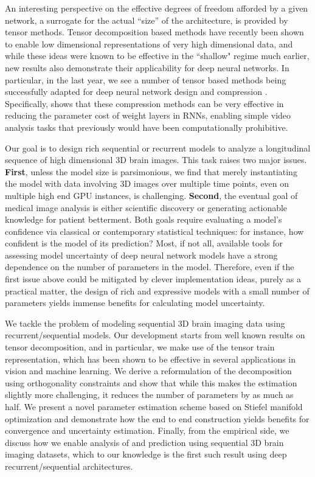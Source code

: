 An interesting perspective on the effective degrees of freedom afforded 
by a given network, a surrogate for the actual ``size'' of the architecture, 
is provided by tensor methods.
Tensor decomposition based methods have recently been shown to enable low dimensional representations of very high dimensional data, 
and while these ideas were known to be effective in the ``shallow" regime much earlier, new results also demonstrate their applicability for deep neural 
networks. 
In particular, in the last year, we see a number of tensor based methods being successfully adapted for deep neural network design and compression \cite{cohen2016expressive,zhang2017tucker,yu2017compressing}.
Specifically, \cite{pmlr-v70-yang17e} shows that these compression methods can be very effective in reducing the parameter cost of weight layers in RNNs, enabling simple video analysis tasks that previously would have been computationally prohibitive.

Our goal is to design rich sequential or recurrent models to analyze a longitudinal sequence of high dimensional 3D brain images. 
This task raises two major issues. \textbf{First}, 
unless the model size is parsimonious, we find that merely instantiating the 
model with data involving 3D images over multiple time points, even on multiple high end GPU instances, is challenging.
\textbf{Second}, 
the eventual goal of medical image analysis is either scientific discovery or generating 
actionable knowledge for patient betterment. 
Both goals require evaluating a model's confidence via 
classical or contemporary statistical techniques: for instance, how confident is the model of its prediction?  
Most, if not all, available tools for assessing 
model uncertainty of deep neural network models 
have a strong dependence on the number of parameters in 
the model. Therefore, even if the first issue above could be mitigated by clever implementation ideas, purely as a practical 
matter, the design of rich and expressive models with a small number of parameters yields immense benefits for calculating model uncertainty.

We tackle the problem of modeling 
sequential 3D brain imaging data using 
recurrent/sequential models. 
Our development starts from well known results on tensor decomposition, and in particular, we
make use of the tensor train representation, which has been shown to be effective in several 
applications in vision and machine learning. We derive a reformulation of the decomposition using 
orthogonality constraints and show that while this makes the estimation slightly more challenging, 
it reduces the number of parameters by as much as half. 
We present a novel parameter estimation scheme based on Stiefel manifold optimization and demonstrate 
how the end to end construction yields benefits for convergence and uncertainty estimation. 
Finally, from the empirical side, we discuss how we enable analysis of and prediction using sequential 3D brain imaging datasets, which to our knowledge is the first such result using 
deep recurrent/sequential architectures. 
